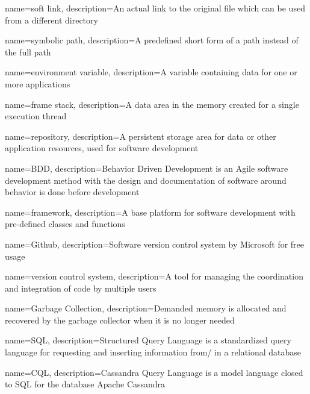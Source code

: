 {
    name={soft link},
    description={An actual link to the original file which can be used from a different directory}
}

{
    name={symbolic path},
    description={A predefined short form of a path instead of the full path}
}

{
    name={environment variable},
    description={A variable containing data for one or more applications}
}

{
    name={frame stack},
    description={A data area in the memory created for a single execution thread}
}

{
    name={repository},
    description={A persistent storage area for data or other application resources, used for software development}
}


{
    name={BDD},
    description={Behavior Driven Development is an Agile software development method with the design and documentation of software around behavior is done before development}
}

{
    name={framework},
    description={A base platform for software development with pre-defined classes and functions}
}


{
    name={Github},
    description={Software version control system by Microsoft for free usage}
}

{
    name={version control system},
    description={A tool for managing the coordination and integration of code by multiple users}
}

{
    name={Garbage Collection},
    description={Demanded memory is allocated and recovered by the garbage collector when it is no longer needed}
}

{
    name={SQL},
    description={Structured Query Language is a standardized query language for requesting and inserting information from/ in a relational database}
}

{
    name={CQL},
    description={Cassandra Query Language is a model language closed to SQL for the database Apache Cassandra}
}

\glsaddall
